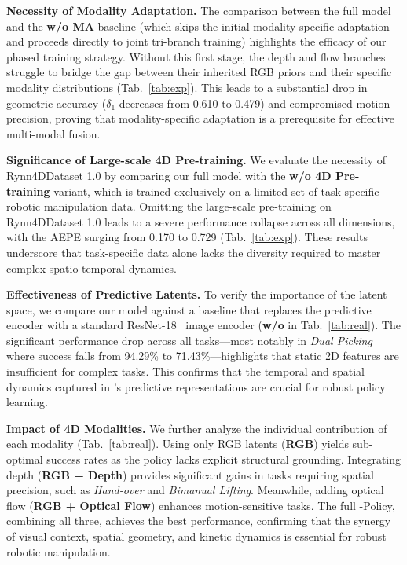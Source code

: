 \noindent 
\textbf{Necessity of Modality Adaptation.}
The comparison between the full model and the \textbf{w/o MA} baseline (which skips the initial modality-specific adaptation and proceeds directly to joint tri-branch training) highlights the efficacy of our phased training strategy. Without this first stage, the depth and flow branches struggle to bridge the gap between their inherited RGB priors and their specific modality distributions (Tab.~\ref{tab:exp}). This leads to a substantial drop in geometric accuracy ($\delta_1$ decreases from 0.610 to 0.479) and compromised motion precision, proving that modality-specific adaptation is a prerequisite for effective multi-modal fusion.


\noindent 
\textbf{Significance of Large-scale 4D Pre-training.}
We evaluate the necessity of Rynn4DDataset 1.0 by comparing our full model with the \textbf{w/o 4D Pre-training} variant, which is trained exclusively on a limited set of task-specific robotic manipulation data. Omitting the large-scale pre-training on Rynn4DDataset 1.0 leads to a severe performance collapse across all dimensions, with the AEPE surging from 0.170 to 0.729 (Tab.~\ref{tab:exp}). These results underscore that task-specific data alone lacks the diversity required to master complex spatio-temporal dynamics.


\noindent
\textbf{Effectiveness of Predictive Latents.}
To verify the importance of the \our latent space, we compare our model against a baseline that replaces the predictive encoder with a standard ResNet-18~\citep{he2016deep} image encoder (\textbf{w/o \our} in Tab.~\ref{tab:real}). The significant performance drop across all tasks—most notably in \textit{Dual Picking} where success falls from 94.29\% to 71.43\%—highlights that static 2D features are insufficient for complex tasks. This confirms that the temporal and spatial dynamics captured in \our's predictive representations are crucial for robust policy learning.

\noindent
\textbf{Impact of 4D Modalities.}
We further analyze the individual contribution of each modality (Tab.~\ref{tab:real}). Using only RGB latents (\textbf{RGB}) yields sub-optimal success rates as the policy lacks explicit structural grounding. Integrating depth (\textbf{RGB + Depth}) provides significant gains in tasks requiring spatial precision, such as \textit{Hand-over} and \textit{Bimanual Lifting}. Meanwhile, adding optical flow (\textbf{RGB + Optical Flow}) enhances motion-sensitive tasks. The full \our-Policy, combining all three, achieves the best performance, confirming that the synergy of visual context, spatial geometry, and kinetic dynamics is essential for robust robotic manipulation.


